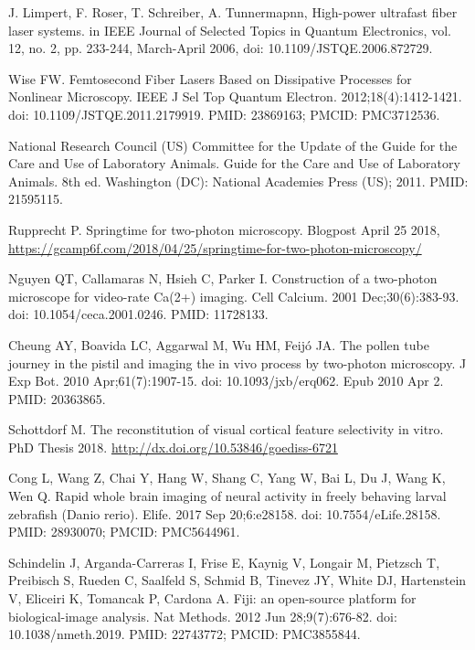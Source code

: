 \documentclass[10pt,letterpaper]{article}
\begin{document}
\begin{thebibliography}{10}
J. Limpert, F. Roser, T. Schreiber, A. Tunnermapnn, High-power ultrafast fiber laser systems. in IEEE Journal of Selected Topics in Quantum Electronics, vol. 12, no. 2, pp. 233-244, March-April 2006, doi: 10.1109/JSTQE.2006.872729.

Wise FW. Femtosecond Fiber Lasers Based on Dissipative Processes for Nonlinear Microscopy. IEEE J Sel Top Quantum Electron. 2012;18(4):1412-1421. doi: 10.1109/JSTQE.2011.2179919. PMID: 23869163; PMCID: PMC3712536.

National Research Council (US) Committee for the Update of the Guide for the Care and Use of Laboratory Animals. Guide for the Care and Use of Laboratory Animals. 8th ed. Washington (DC): National Academies Press (US); 2011. PMID: 21595115.

Rupprecht P. Springtime for two-photon microscopy. Blogpost April 25 2018, \url{https://gcamp6f.com/2018/04/25/springtime-for-two-photon-microscopy/}

Nguyen QT, Callamaras N, Hsieh C, Parker I. Construction of a two-photon microscope for video-rate Ca(2+) imaging. Cell Calcium. 2001 Dec;30(6):383-93. doi: 10.1054/ceca.2001.0246. PMID: 11728133.

Cheung AY, Boavida LC, Aggarwal M, Wu HM, Feijó JA. The pollen tube journey in the pistil and imaging the in vivo process by two-photon microscopy. J Exp Bot. 2010 Apr;61(7):1907-15. doi: 10.1093/jxb/erq062. Epub 2010 Apr 2. PMID: 20363865.

Schottdorf M. The reconstitution of visual cortical feature selectivity in vitro. PhD Thesis 2018. \url{http://dx.doi.org/10.53846/goediss-6721}

Cong L, Wang Z, Chai Y, Hang W, Shang C, Yang W, Bai L, Du J, Wang K, Wen Q. Rapid whole brain imaging of neural activity in freely behaving larval zebrafish (Danio rerio). Elife. 2017 Sep 20;6:e28158. doi: 10.7554/eLife.28158. PMID: 28930070; PMCID: PMC5644961.

Schindelin J, Arganda-Carreras I, Frise E, Kaynig V, Longair M, Pietzsch T, Preibisch S, Rueden C, Saalfeld S, Schmid B, Tinevez JY, White DJ, Hartenstein V, Eliceiri K, Tomancak P, Cardona A. Fiji: an open-source platform for biological-image analysis. Nat Methods. 2012 Jun 28;9(7):676-82. doi: 10.1038/nmeth.2019. PMID: 22743772; PMCID: PMC3855844.


\end{thebibliography}
\end{document}
